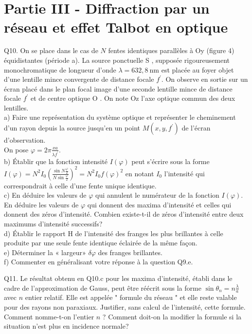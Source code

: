 \documentclass[10pt]{article}
\begin{document}
\section*{Partie III - Diffraction par un réseau et effet Talbot en optique}
Q10. On se place dans le cas de \(N\) fentes identiques parallèles à Oy (figure 4) équidistantes (période a). La source ponctuelle S , supposée rigoureusement monochromatique de longueur d'onde \(\lambda=632,8 \mathrm{~nm}\) est placée au foyer objet d'une lentille mince convergente de distance focale \(f^{\prime}\). On observe en sortie sur un écran placé dans le plan focal image d'une seconde lentille mince de distance focale \(f^{\prime}\) et de centre optique O . On note Oz l'axe optique commun des deux lentilles.\\
a) Faire une représentation du système optique et représenter le cheminement d'un rayon depuis la source jusqu'en un point \(M\left(x, y, f^{\prime}\right)\) de l'écran d'observation.\\
On pose \(\varphi=2 \pi \frac{x a}{\lambda f^{\prime}}\).\\
b) Établir que la fonction intensité \(I(\varphi)\) peut s'écrire sous la forme \(I(\varphi)=N^{2} I_{0}\left(\frac{\sin N \frac{\varphi}{2}}{N \sin \frac{\varphi}{2}}\right)^{2}=N^{2} I_{0} f(\varphi)^{2}\) en notant \(I_{0}\) l'intensité qui correspondrait à celle d'une fente unique identique.\\
c) En déduire les valeurs de \(\varphi\) qui annulent le numérateur de la fonction \(I(\varphi)\). En déduire les valeurs de \(\varphi\) qui donnent des maxima d'intensité et celles qui donnent des zéros d'intensité. Combien existe-t-il de zéros d'intensité entre deux maximums d'intensité successifs?\\
d) Établir le rapport H de l'intensité des franges les plus brillantes à celle produite par une seule fente identique éclairée de la même façon.\\
e) Déterminer la « largeur» \(\delta \varphi\) des franges brillantes.\\
f) Commenter en généralisant votre réponse à la question Q9.e.

Q11. Le résultat obtenu en Q10.c pour les maxima d'intensité, établi dans le cadre de l'approximation de Gauss, peut être réécrit sous la forme \(\sin \theta_{n}=n \frac{\lambda}{a}\) avec \(n\) entier relatif. Elle est appelée " formule du réseau " et elle reste valable pour des rayons non paraxiaux. Justifier, sans calcul de l'intensité, cette formule. Comment nomme-t-on l'entier \(n\) ? Comment doit-on la modifier la formule si la situation n'est plus en incidence normale?
\end{document}
